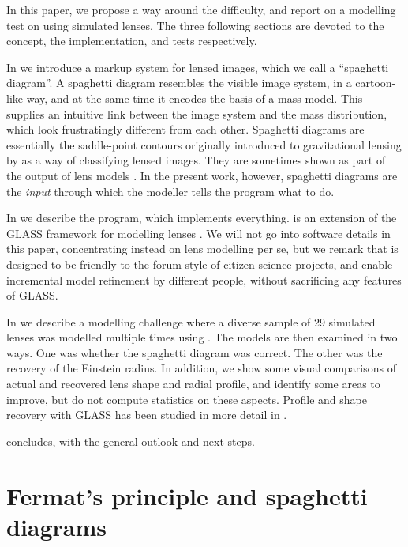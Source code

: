 In this paper, we propose a way around the difficulty, and report on a
modelling test on \sw using simulated lenses.  The three following
sections are devoted to the concept, the implementation, and tests
respectively.

In  we introduce a markup system for lensed images,
which we call a ``spaghetti diagram''.  A spaghetti diagram resembles
the visible image system, in a cartoon-like way, and at the same time
it encodes the basis of a mass model.  This supplies an intuitive link
between the image system and the mass distribution, which look
frustratingly different from each other.  Spaghetti diagrams are
essentially the saddle-point contours originally introduced to
gravitational lensing by \cite{1986ApJ...310..568B} as a way of
classifying lensed images.  They are sometimes shown as part of the
output of lens models \citep[for
  example][]{2001ApJ...557..594R,2003ApJ...590...39K,Lubini2012}.  In
the present work, however, spaghetti diagrams are the {\em input\/}
through which the modeller tells the program what to do.

In  we describe the \spl program, which
implements everything.  \spl is an extension of the GLASS framework
for modelling lenses \citep{2014arXiv1401.7990C}.  We will not go into
software details in this paper, concentrating instead on lens
modelling per se, but we remark that \spl is designed to be friendly
to the forum style of citizen-science projects, and enable incremental
model refinement by different people, without sacrificing any features
of GLASS.

In  we describe a modelling challenge where a
diverse sample of 29 simulated lenses was modelled multiple times
using \spl.  The models are then examined in two ways.  One was
whether the spaghetti diagram was correct.  The other was the recovery
of the Einstein radius.  In addition, we show some visual comparisons
of actual and recovered lens shape and radial profile, and identify
some areas to improve, but do not compute statistics on these aspects.
Profile and shape recovery with GLASS has been studied in more detail
in \citep{2014arXiv1401.7990C}.

 concludes, with the general outlook and next steps.

\section{Fermat's principle and spaghetti diagrams} \label{sec:Fermat}

